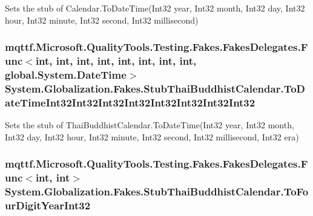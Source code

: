 Sets the stub of Calendar.\-To\-Date\-Time(\-Int32 year, Int32 month, Int32 day, Int32 hour, Int32 minute, Int32 second, Int32 millisecond)

\hypertarget{class_system_1_1_globalization_1_1_fakes_1_1_stub_thai_buddhist_calendar_a1899b8b1593bbb3780f272899efd5cd2}{
\subsubsection[{To\-Date\-Time\-Int32\-Int32\-Int32\-Int32\-Int32\-Int32\-Int32\-Int32}]{\setlength{\rightskip}{0pt plus 5cm}mqttf.\-Microsoft.\-Quality\-Tools.\-Testing.\-Fakes.\-Fakes\-Delegates.\-Func$<$int, int, int, int, int, int, int, int, global.\-System.\-Date\-Time$>$ System.\-Globalization.\-Fakes.\-Stub\-Thai\-Buddhist\-Calendar.\-To\-Date\-Time\-Int32\-Int32\-Int32\-Int32\-Int32\-Int32\-Int32\-Int32}}\label{class_system_1_1_globalization_1_1_fakes_1_1_stub_thai_buddhist_calendar_a1899b8b1593bbb3780f272899efd5cd2}


Sets the stub of Thai\-Buddhist\-Calendar.\-To\-Date\-Time(\-Int32 year, Int32 month, Int32 day, Int32 hour, Int32 minute, Int32 second, Int32 millisecond, Int32 era)

\hypertarget{class_system_1_1_globalization_1_1_fakes_1_1_stub_thai_buddhist_calendar_a35e71ee372eb0c66b664f4fd1f90faa1}{
\subsubsection[{To\-Four\-Digit\-Year\-Int32}]{\setlength{\rightskip}{0pt plus 5cm}mqttf.\-Microsoft.\-Quality\-Tools.\-Testing.\-Fakes.\-Fakes\-Delegates.\-Func$<$int, int$>$ System.\-Globalization.\-Fakes.\-Stub\-Thai\-Buddhist\-Calendar.\-To\-Four\-Digit\-Year\-Int32}}\label{class_system_1_1_globalization_1_1_fakes_1_1_stub_thai_buddhist_calendar_a35e71ee372eb0c66b664f4fd1f90faa1}


